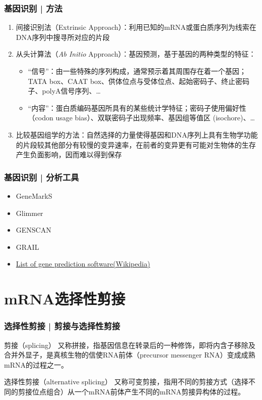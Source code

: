 \begin{frame}
	\frametitle{基因识别 | 方法}
	\begin{enumerate}
		\item 间接识别法（Extrinsic Approach）：利用已知的mRNA或蛋白质序列为线索在DNA序列中搜寻所对应的片段
		\item 从头计算法（\textit{Ab Initio} Approach）：基因预测，基于基因的两种类型的特征：
			\begin{itemize}
				\item “信号”：由一些特殊的序列构成，通常预示着其周围存在着一个基因；TATA box、CAAT box、供体位点与受体位点、起始密码子、终止密码子、polyA信号序列、\ldots
				\item “内容”：蛋白质编码基因所具有的某些统计学特征；密码子使用偏好性（codon usage bias）、双联密码子出现频率、基因组等值区 (isochore)、\ldots
			\end{itemize}
		\item 比较基因组学的方法：自然选择的力量使得基因和DNA序列上具有生物学功能的片段较其他部分有较慢的变异速率，在前者的变异更有可能对生物体的生存产生负面影响，因而难以得到保存
	\end{enumerate}
\end{frame}

\begin{frame}
	\frametitle{基因识别 | 分析工具}
	\begin{itemize}
		\item GeneMarkS
		\item Glimmer
		\item GENSCAN
		\item GRAIL
		\item \href{http://en.wikipedia.org/wiki/List\_of\_gene\_prediction\_software}{List of gene prediction software(Wikipedia)}
	\end{itemize}
\end{frame}

\section{mRNA选择性剪接}
\begin{frame}
	\frametitle{选择性剪接 | 剪接与选择性剪接}
	\begin{block}{剪接（splicing）}
		又称拼接，指基因信息在转录后的一种修饰，即将内含子移除及合并外显子，是真核生物的信使RNA前体（precursor messenger RNA）变成成熟mRNA的过程之一。
	\end{block}
	\pause
	\begin{block}{选择性剪接（alternative splicing）}
		又称可变剪接，指用不同的剪接方式（选择不同的剪接位点组合）从一个mRNA前体产生不同的mRNA剪接异构体的过程。
	\end{block}
\end{frame}

